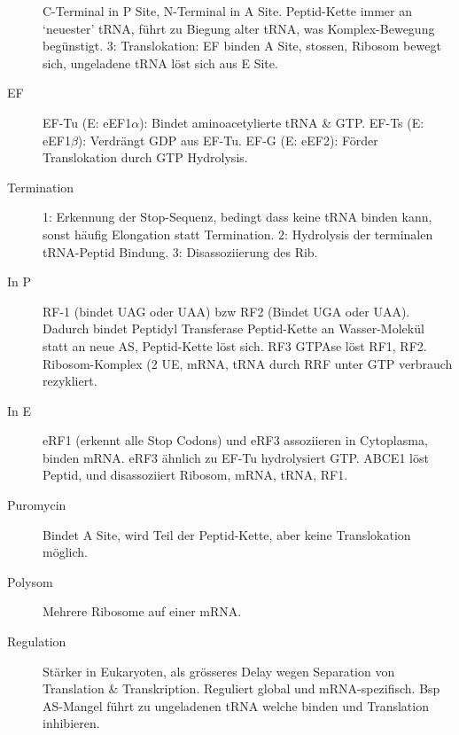 \documentclass[a4paper,twocolumn,usegeometry,english,fontsize=5,DIV=24]{scrartcl}
\begin{document}
\begin{description}
		C-Terminal in P Site, N-Terminal in A Site. Peptid-Kette immer
		an `neuester' tRNA, führt zu Biegung alter tRNA, was
		Komplex-Bewegung begünstigt. 3: Translokation: EF binden A
		Site, stossen, Ribosom bewegt sich, ungeladene tRNA löst sich
		aus E Site.
	\item[EF] EF-Tu (E: eEF1$\alpha$): Bindet aminoacetylierte tRNA \& GTP.
		EF-Ts (E: eEF1$\beta$): Verdrängt GDP aus EF-Tu. EF-G (E:
		eEF2): Förder Translokation durch GTP Hydrolysis.
	\item[Termination] 1: Erkennung der Stop-Sequenz, bedingt dass keine
		tRNA binden kann, sonst häufig Elongation statt Termination. 2:
		Hydrolysis der terminalen tRNA-Peptid Bindung. 3:
		Disassoziierung des Rib.
	\item[In P] RF-1 (bindet UAG oder UAA) bzw RF2 (Bindet UGA oder UAA).
		Dadurch bindet Peptidyl Transferase Peptid-Kette an
		Wasser-Molekül statt an neue AS, Peptid-Kette löst sich. RF3
		GTPAse löst RF1, RF2. Ribosom-Komplex (2 UE, mRNA, tRNA durch
		RRF unter GTP verbrauch rezykliert.
	\item[In E] eRF1 (erkennt alle Stop Codons) und eRF3 assoziieren in
		Cytoplasma, binden mRNA. eRF3 ähnlich zu EF-Tu hydrolysiert
		GTP. ABCE1 löst Peptid, und disassoziiert Ribosom, mRNA, tRNA,
		RF1.
	\item[Puromycin] Bindet A Site, wird Teil der Peptid-Kette, aber keine
		Translokation möglich.
	\item[Polysom] Mehrere Ribosome auf einer mRNA.
	\item[Regulation] Stärker in Eukaryoten, als grösseres Delay wegen
		Separation von Translation \& Transkription. Reguliert global
		und mRNA-spezifisch. Bsp AS-Mangel führt zu ungeladenen tRNA
		welche binden und Translation inhibieren.
\end{description}
\end{document}
